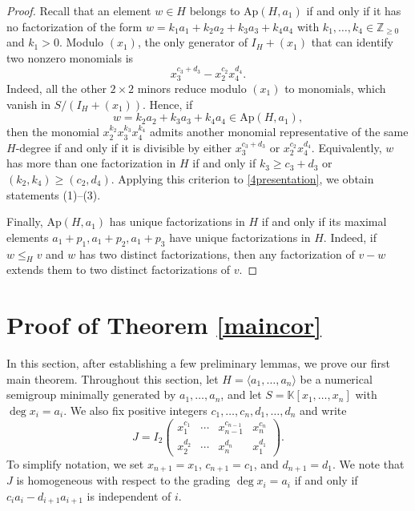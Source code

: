 \documentclass[12pt]{amsart}
\numberwithin{equation}{section}
\theoremstyle{definition}
\newcommand{\F}{\mathbb{K}}
\newcommand{\Ap}{\mathrm{Ap}}
\begin{document}
\begin{proof}
Recall that an element $w\in H$ belongs to $\Ap(H,a_1)$ if and only if
it has no factorization of the form
$
w=k_1a_1+k_2a_2+k_3a_3+k_4a_4
$
with $k_1,\dots,k_4\in\mathbb Z_{\geq0}$ and $k_1>0$.
Modulo $(x_1)$, the only generator of $I_H+(x_1)$ that can identify
two nonzero monomials is
\[
x_3^{c_3+d_3}-x_2^{c_2}x_4^{d_4}.
\]
Indeed, all the other $2\times2$ minors reduce modulo $(x_1)$ to
monomials, which vanish in $S/(I_H+(x_1))$.
Hence, if
\[
w=k_2a_2+k_3a_3+k_4a_4\in\Ap(H,a_1),
\]
then the monomial $x_2^{k_2}x_3^{k_3}x_4^{k_4}$ admits another
monomial representative of the same $H$-degree if and only if it is
divisible by either $x_3^{c_3+d_3}$ or $x_2^{c_2}x_4^{d_4}$.
Equivalently, $w$ has more than one factorization in $H$ if and only if
$k_3\geq c_3+d_3$ or $(k_2,k_4) \geq (c_2,d_4)$.
Applying this criterion to \eqref{4presentation}, we obtain
statements (1)--(3).

Finally, $\Ap(H,a_1)$ has unique factorizations in $H$ if and only if
its maximal elements $a_1+p_1,a_1+p_2,a_1+p_3$ have unique
factorizations in $H$.
Indeed, if $w\leq_H v$ and $w$ has two distinct factorizations, then
any factorization of $v-w$ extends them to two distinct factorizations
of $v$.
\end{proof}




















\section{Proof of Theorem \ref{maincor}}

In this section, after establishing a few preliminary lemmas, we prove
our first main theorem.
Throughout this section, let
$H=\langle a_1,\dots,a_n\rangle$ be a numerical semigroup minimally
generated by $a_1,\dots,a_n$, and let
$S=\F[x_1,\dots,x_n]$ with $\deg x_i=a_i$.
We also fix positive integers
$c_1,\dots,c_n,d_1,\dots,d_n$ and write
    \[J=I_2 \begin{pmatrix} x_1^{c_1} & \cdots & x_{n-1}^{c_{n-1}} & x_n ^{c_n} \\ x_2^{d_2} & \cdots & x_{n}^{d_{n}} & x_1 ^{d_1}\end{pmatrix}.\]
To simplify notation, we set
$x_{n+1}=x_1$, $c_{n+1}=c_1$, and $d_{n+1}=d_1$.
We note that $J$ is homogeneous with respect to the grading
$\deg x_i=a_i$ if and only if
$
c_i a_i-d_{i+1}a_{i+1}
$ is independent of $i$.
\end{document}
